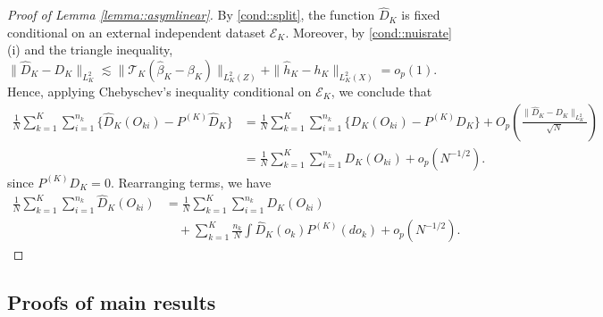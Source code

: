 \documentclass[11pt]{article}
\theoremstyle{plain}
\theoremstyle{definition}
\theoremstyle{remark}
\theoremstyle{definition}
\begin{document}
\begin{proof}[Proof of Lemma \ref{lemma::asymlinear}]


By \ref{cond::split}, the function $\widehat{D}_K$ is fixed conditional on an external independent dataset $\mathcal{E}_K$. Moreover, by \ref{cond::nuisrate}(i) and the triangle inequality, $\|\widehat{D}_K - D_K\|_{L^2_K} \lesssim \| \mathcal{T}_{K}( \widehat{\beta}_K - \beta_{K}) \|_{L^2_K(Z)} + \|  \widehat{h}_K - h_K\|_{L^2_K(X)} = o_p(1)$. Hence, applying Chebyschev's inequality conditional on $\mathcal{E}_K$, we conclude that
  \begin{align*}
      \frac{1}{N}   \sum_{k=1}^K \sum_{i=1}^{n_k} \{ \widehat{D}_K(O_{ki}) - P^{(K)} \widehat{D}_K \}  &=    \frac{1}{N}   \sum_{k=1}^K \sum_{i=1}^{n_k} \{D_K(O_{ki}) - P^{(K)} D_K\}  + O_p\left( \frac{\|\widehat{D}_K - D_K\|_{L^2_K} }{\sqrt{N}}\right)\\
      &=   \frac{1}{N}   \sum_{k=1}^K \sum_{i=1}^{n_k} D_K(O_{ki}) + o_p(N^{-1/2}).
  \end{align*}  
since $P^{(K)} D_K = 0$. Rearranging terms, we have
      \begin{align*}
      \frac{1}{N}   \sum_{k=1}^K \sum_{i=1}^{n_k} \widehat{D}_K(O_{ki})  &=    \frac{1}{N}   \sum_{k=1}^K \sum_{i=1}^{n_k} D_K(O_{ki}) \\
      & \quad +  \sum_{k=1}^K  \frac{n_k}{N} \int  \widehat{D}_K(o_k)  P^{(K)}(do_k) + o_p(N^{-1/2}).
  \end{align*}  
\end{proof}


\subsection{Proofs of main results}
\end{document}
